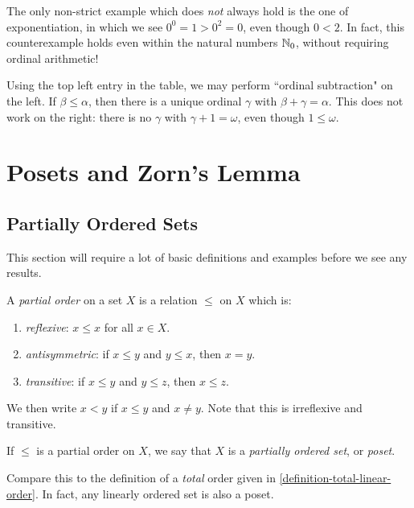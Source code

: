 \documentclass{article}
\begin{document}
\begin{note}
	The only non-strict example which does \textit{not} always hold is the one of exponentiation, in which we see $0^0 = 1 > 0^2 = 0$, even though $0 < 2$. In fact, this counterexample holds even within the natural numbers $\mathbb{N}_0$, without requiring ordinal arithmetic!
\end{note}

\begin{corollary}
    Using the top left entry in the table, we may perform ``ordinal subtraction" on the left. If $\beta \leq \alpha$, then there is a unique ordinal $\gamma$ with $\beta + \gamma = \alpha$. This does not work on the right: there is no $\gamma$ with $\gamma + 1 = \omega$, even though $1 \leq \omega$.
\end{corollary}

\pagebreak
\section{Posets and Zorn's Lemma}
\subsection{Partially Ordered Sets}
\label{section-posets}

This section will require a lot of basic definitions and examples before we see any results.

\begin{definition}
    A \textit{partial order} on a set $X$ is a relation $\leq$ on $X$ which is:
    \begin{enumerate}
	    \item \textit{reflexive}: $x \leq x$ for all $x \in X$.
	    \item \textit{antisymmetric}: if $x \leq y$ and $y \leq x$, then $x = y$.
	    \item \textit{transitive}: if $x \leq y$ and $y \leq z$, then $x \leq z$.
	\end{enumerate}
	We then write $x < y$ if $x \leq y$ and $x \neq y$. Note that this is irreflexive and transitive.
	
	If $\leq$ is a partial order on $X$, we say that $X$ is a \textit{partially ordered set}, or \textit{poset}.
\end{definition}

\begin{note}
	Compare this to the definition of a \textit{total} order given in \ref{definition-total-linear-order}. In fact, any linearly ordered set is also a poset.
\end{note}
\end{document}
